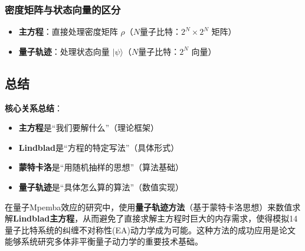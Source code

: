 \documentclass[11pt,a4paper]{article}
\begin{document}
\subsubsection{密度矩阵与状态向量的区分}

\begin{itemize}
    \item \textbf{主方程}：直接处理密度矩阵 $\rho$（$N$量子比特：$2^N \times 2^N$ 矩阵）
    \item \textbf{量子轨迹}：处理状态向量 $|\psi\rangle$（$N$量子比特：$2^N$ 向量）
\end{itemize}

\subsection{总结}

\textbf{核心关系总结}：
\begin{itemize}
    \item \textbf{主方程}是``我们要解什么''（理论框架）
    \item \textbf{Lindblad}是``方程的特定写法''（具体形式）  
    \item \textbf{蒙特卡洛}是``用随机抽样的思想''（算法基础）
    \item \textbf{量子轨迹}是``具体怎么算的算法''（数值实现）
\end{itemize}

在量子Mpemba效应的研究中，使用\textbf{量子轨迹方法}（基于蒙特卡洛思想）来数值求解\textbf{Lindblad主方程}，从而避免了直接求解主方程时巨大的内存需求，使得模拟14量子比特系统的纠缠不对称性(EA)动力学成为可能。这种方法的成功应用是论文能够系统研究多体非平衡量子动力学的重要技术基础。
\end{document}
